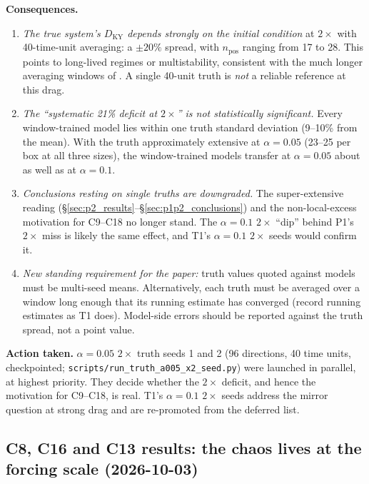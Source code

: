 \documentclass[11pt]{article}
\begin{document}
\textbf{Consequences.}
\begin{enumerate}[leftmargin=*]
\item \emph{The true system's $D_{\mathrm{KY}}$ depends strongly on the
  initial condition} at $2\times$ with 40-time-unit averaging: a
  $\pm20\%$ spread, with $n_{\mathrm{pos}}$ ranging from 17 to 28. This
  points to long-lived regimes or multistability, consistent with the
  much longer averaging windows of \cite{kolmogorovregimes2026}. A single
  40-unit truth is \emph{not} a reliable reference at this drag.
\item \emph{The ``systematic 21\% deficit at $2\times$'' is not
  statistically significant.} Every window-trained model lies within one
  truth standard deviation (9--10\% from the mean). With the truth
  approximately extensive at $\alpha{=}0.05$ (23--25 per box at all three
  sizes), the window-trained models transfer at $\alpha{=}0.05$ about as
  well as at $\alpha{=}0.1$.
\item \emph{Conclusions resting on single truths are downgraded.} The
  super-extensive reading
  (\S\ref{sec:p2_results}--\S\ref{sec:p1p2_conclusions}) and the
  non-local-excess motivation for C9--C18 no longer stand. The
  $\alpha{=}0.1$ $2\times$ ``dip'' behind P1's $2\times$ miss is likely
  the same effect, and T1's $\alpha{=}0.1$ $2\times$ seeds would confirm
  it.
\item \emph{New standing requirement for the paper:} truth values
  quoted against models must be multi-seed means. Alternatively, each
  truth must be averaged over a window long enough that its running
  estimate has converged (record running estimates as T1 does).
  Model-side errors should be reported against the truth spread, not a
  point value.
\end{enumerate}

\textbf{Action taken.} $\alpha{=}0.05$ $2\times$ truth seeds 1 and 2 (96
directions, 40 time units, checkpointed;
\texttt{scripts/run\_truth\_a005\_x2\_seed.py}) were launched in
parallel, at highest priority. They decide whether the $2\times$ deficit,
and hence the motivation for C9--C18, is real. T1's $\alpha{=}0.1$ $2\times$
seeds address the mirror question at strong drag and are re-promoted
from the deferred list.

\subsection{C8, C16 and C13 results: the chaos lives at the forcing scale (2026-10-03)}
\label{sec:c8_c16_c13_results}
\end{document}
